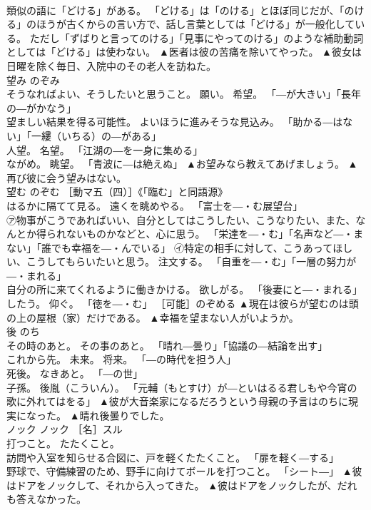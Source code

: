 \documentclass[8pt]{extreport}
\begin{document}
\begin{CJK}{UTF8}{min}
\\	類似の語に「どける」がある。 「どける」は「のける」とほぼ同じだが、「のける」のほうが古くからの言い方で、話し言葉としては「どける」が一般化している。 ただし「ずばりと言ってのける」「見事にやってのける」のような補助動詞としては「どける」は使わない。	▲医者は彼の苦痛を除いてやった。 ▲彼女は日曜を除く毎日、入院中のその老人を訪ねた。
\\	望み	のぞみ	
\\	そうなればよい、そうしたいと思うこと。 願い。 希望。 「―が大きい」「長年の―がかなう」 
\\	望ましい結果を得る可能性。 よいほうに進みそうな見込み。 「助かる―はない」「一縷（いちる）の―がある」 
\\	人望。 名望。 「江湖の―を一身に集める」 
\\	ながめ。 眺望。 「青波に―は絶えぬ」	▲お望みなら教えてあげましょう。 ▲再び彼に会う望みはない。
\\	望む	のぞむ	［動マ五（四）］《「臨む」と同語源》 
\\	はるかに隔てて見る。 遠くを眺めやる。 「富士を―・む展望台」 
\\	㋐物事がこうであればいい、自分としてはこうしたい、こうなりたい、また、なんとか得られないものかなどと、心に思う。 「栄達を―・む」「名声など―・まない」「誰でも幸福を―・んでいる」 ㋑特定の相手に対して、こうあってほしい、こうしてもらいたいと思う。 注文する。 「自重を―・む」「一層の努力が―・まれる」 
\\	自分の所に来てくれるように働きかける。 欲しがる。 「後妻にと―・まれる」 
\\	したう。 仰ぐ。 「徳を―・む」 ［可能］のぞめる	▲現在は彼らが望むのは頭の上の屋根（家）だけである。 ▲幸福を望まない人がいようか。
\\	後	のち	
\\	その時のあと。 その事のあと。 「晴れ―曇り」「協議の―結論を出す」 
\\	これから先。 未来。 将来。 「―の時代を担う人」 
\\	死後。 なきあと。 「―の世」 
\\	子孫。 後胤（こういん）。 「元輔（もとすけ）が―といはるる君しもや今宵の歌に外れてはをる」	▲彼が大音楽家になるだろうという母親の予言はのちに現実になった。 ▲晴れ後曇りでした。
\\	ノック	ノック	［名］スル 
\\	打つこと。 たたくこと。 
\\	訪問や入室を知らせる合図に、戸を軽くたたくこと。 「扉を軽く―する」 
\\	野球で、守備練習のため、野手に向けてボールを打つこと。 「シート―」	▲彼はドアをノックして、それから入ってきた。 ▲彼はドアをノックしたが、だれも答えなかった。

\end{CJK}
\end{document}
